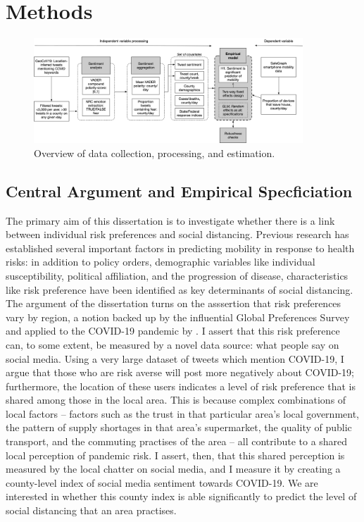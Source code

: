 \documentclass{article}
\begin{document}
\section{Methods}\label{methods}
\begin{figure}[!htb]
  \centering
  \caption{Overview of data collection, processing, and estimation.}\label{process}
  \includegraphics[width=0.9\textwidth]{figs/processing.png}
\end{figure}
\subsection{Central Argument and Empirical Specficiation}
The primary aim of this dissertation is to investigate whether there is a link between individual risk preferences and social distancing. Previous research has established several important factors in predicting mobility in response to health risks: in addition to policy orders, demographic variables like individual susceptibility, political affiliation, and the progression of disease, characteristics like risk preference have been identified as key determinants of social distancing. The argument of the dissertation turns on the asssertion that risk preferences vary by region, a notion backed up by the influential Global Preferences Survey \parencite{falkGlobalEvidenceEconomic2018} and applied to the COVID-19 pandemic by \textcite{fanHeterogeneousActionsBeliefs2020}. I assert that this risk preference can, to some extent, be measured by a novel data source: what people say on social media. Using a very large dataset of tweets which mention COVID-19, I argue that those who are risk averse will post more negatively about COVID-19; furthermore, the location of these users indicates a level of risk preference that is shared among those in the local area. This is because complex combinations of local factors -- factors such as the trust in that particular area's local government, the pattern of supply shortages in that area's supermarket, the quality of public transport, and the commuting practises of the area -- all contribute to a shared local perception of pandemic risk. I assert, then, that this shared perception is measured by the local chatter on social media, and I measure it by creating a county-level index of social media sentiment towards COVID-19. We are interested in whether this county index is able significantly to predict the level of social distancing that an area practises.
\end{document}
